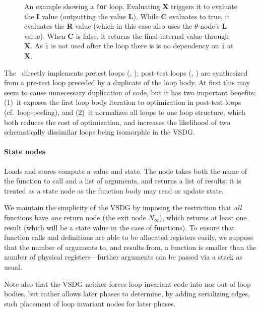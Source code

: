 {\begin{figure}[!ht]
\caption{An example showing a \texttt{for} loop. 
  Evaluating \textbf{X} triggers it to evaluate the \textbf{I} value (outputting the value \textbf{L}). 
  While \textbf{C} evaluates to true, it evaluates the \textbf{R} value (which in this case also uses the $\theta$-node's \textbf{L} value). 
  When \textbf{C} is false, it returns the final internal value through \textbf{X}. 
  As \texttt{i} is not used after the loop there is is no dependency on \texttt{i} at \textbf{X}.}
\label{fig:thetatuple}
\end{figure}

The \Tn\ directly implements pretest loops (, ); 
post-test loops (, ) are synthesized from a pre-test loop preceded by a duplicate of the loop body. 
At first this may seem to cause unnecessary duplication of code, but it has two important benefits: 
(1)~it exposes the first loop body iteration to optimization in post-test loops (cf.~loop-peeling), and (2)~it normalizes all loops to one loop structure, which both reduces the cost of optimization, and increases the likelihood of two schematically dissimilar loops being isomorphic in the VSDG.


\paragraph{State nodes}
Loads and stores compute a value and state. 
The  node takes both the name of the function to call and a list of arguments, and returns a list of results; 
it is treated as a state node as the function body may read or update state.

\medskip

We maintain the simplicity of the VSDG by imposing the restriction that \emph{all} functions have \emph{one} return node (the exit node $N_\infty$), which returns at least one result (which will be a state value in the case of  functions). 
To ensure that function calls and definitions are able to be allocated registers easily, we suppose that the number of arguments to, and results from, a function is smaller than the number of physical registers---further arguments can be passed via a stack as usual.

Note also that the VSDG neither forces loop invariant code into nor out-of loop bodies, but rather allows later phases to determine, by adding serializing edges, such placement of loop invariant nodes for later phases.

}
